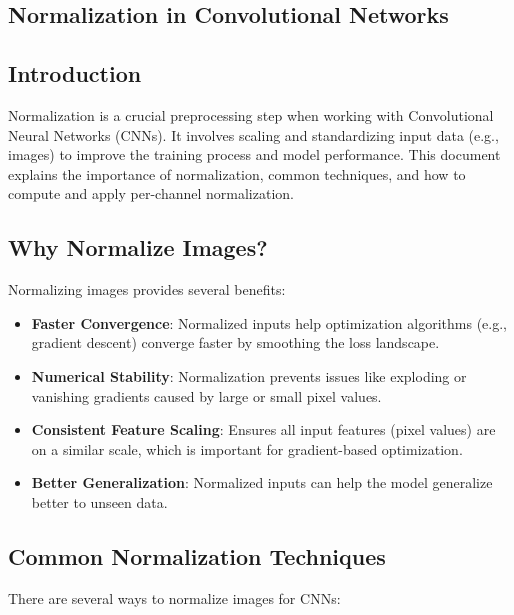 \begin{notechapter}
\chapter{Normalization in Convolutional Networks}\label{ch:cnn-normalization}

\section{Introduction}
Normalization is a crucial preprocessing step when working with
Convolutional Neural Networks (CNNs). It involves scaling and
standardizing input data (e.g., images) to improve the training
process and model performance. This document explains the
importance of normalization, common techniques, and how to compute
and apply per-channel normalization.

\section{Why Normalize Images?}
Normalizing images provides several benefits:
\begin{itemize}
    \item \textbf{Faster Convergence}: Normalized inputs help
          optimization algorithms (e.g., gradient descent) converge
          faster by smoothing the loss landscape.
    \item \textbf{Numerical Stability}: Normalization prevents issues
          like exploding or vanishing gradients caused by large or
          small pixel values.
    \item \textbf{Consistent Feature Scaling}: Ensures all input
          features (pixel values) are on a similar scale, which is
          important for gradient-based optimization.
    \item \textbf{Better Generalization}: Normalized inputs can help
          the model generalize better to unseen data.
\end{itemize}

\section{Common Normalization Techniques}
There are several ways to normalize images for CNNs:


\end{notechapter}
